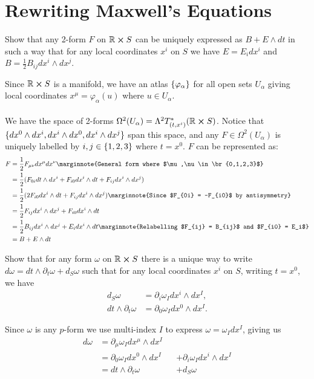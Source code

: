 \documentclass[10pt]{article}
\begin{document}
\newpage
\section{Rewriting Maxwell's Equations}\label{b1c5}




\begin{example}
	Show that any 2-form $F$ on $\mathbb{R} \cross S$ can be uniquely expressed as $B + E \wedge dt$ in such a way that for any local coordinates $x^i$ on $S$ we have $E=E_idx^i$ and $B=\frac12 B_{ij}dx^i\wedge dx^j$.
\end{example}
\sol Since $\mathbb{R} \cross S$ is a manifold, we have an atlas $\lbrace\varphi_\alpha\rbrace$ for all open sets $U_\alpha$ giving local coordinates $x^\mu = \varphi_\alpha(u)$ where $u \in U_\alpha$.\\\\
We have the space of 2-forms $\Omega^2(U_\alpha) = \Lambda^2 T_{(t,x^i)}^*(\mathbb{R} \cross S)$. Notice that $\lbrace dx^0 \wedge dx^i, dx^i \wedge dx^0, dx^i \wedge dx^j\rbrace$ span this space, and any $F \in \Omega^2(U_\alpha)$ is uniquely labelled by $i, j \in \lbrace1,2,3\rbrace$ where $t=x^0$. $F$ can be represented as:
$$
\begin{aligned}
	F &= \frac12 F_{\mu\nu} dx^\mu dx^\nu\marginnote{General form where $\mu,\nu \in \br{0,1,2,3}$}\\
	&= \frac12 (F_{0i} dt \wedge dx^i + F_{i0} dx^i \wedge dt + F_{ij} dx^i \wedge dx^j)\\
	&= \frac12 (2F_{i0} dx^i \wedge dt + F_{ij} dx^i \wedge dx^j)\marginnote{Since $F_{0i} = -F_{i0}$ by antisymmetry}\\
	&= \frac12 F_{ij} dx^i \wedge dx^j + F_{i0} dx^i \wedge dt\\
	&= \frac12 B_{ij} dx^i \wedge dx^j + E_{i} dx^i \wedge dt\marginnote{Relabelling $F_{ij} = B_{ij}$ and $F_{i0} = E_i$}\\
	&= B + E \wedge dt
\end{aligned}
$$


\begin{example}\label{b1e51}
	Show that for any form $\omega$ on $\mathbb{R} \cross S$ there is a unique way to write $d\omega=dt \wedge \partial_t\omega+d_S\omega$ such that for any local coordinates $x^i$ on $S$, writing $t=x^0$, we have
	$$
		\begin{aligned}
			d_S\omega &= \partial_i \omega_I dx^i \wedge dx^I,\\
			dt \wedge \partial_t\omega &= \partial_0 \omega_I dx^0 \wedge dx^I.
		\end{aligned}
	$$
\end{example}
\sol Since $\omega$ is any $p$-form we use multi-index $I$ to express $\omega = \omega_I dx^I$, giving us
$$
\begin{aligned}
	d\omega &= \partial_\mu \omega_I dx^\mu \wedge dx^I\\
	&= \partial_0 \omega_I dx^0 \wedge dx^I &&+ \partial_i \omega_I dx^i \wedge dx^I\\
	&= dt \wedge \partial_t\omega &&+ d_S\omega
\end{aligned}
$$
\end{document}
